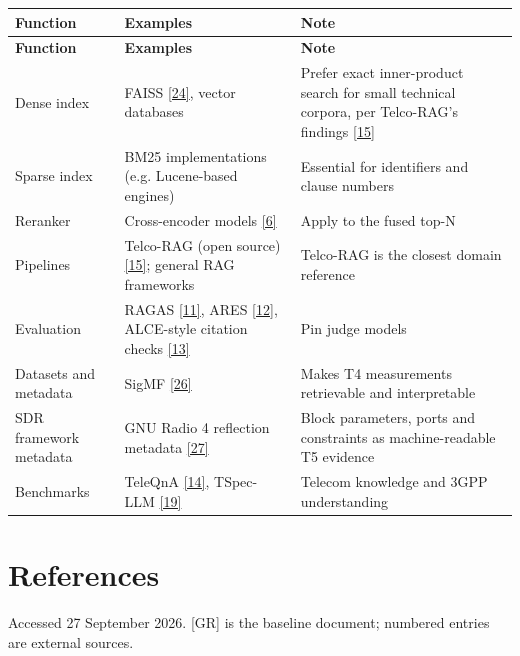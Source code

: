 \documentclass[11pt,a4paper]{article}
\begin{document}
{\small
\begin{longtable}{>{\raggedright\arraybackslash}p{}>{\raggedright\arraybackslash}p{}>{\raggedright\arraybackslash}p{}}
\toprule
\rowcolor{headbg} \textbf{Function} & \textbf{Examples} & \textbf{Note} \\
\midrule
\endfirsthead
\toprule
\rowcolor{headbg} \textbf{Function} & \textbf{Examples} & \textbf{Note} \\
\midrule
\endhead
\bottomrule
\endlastfoot
Dense index & FAISS \hyperlink{ref24}{[24]}, vector databases & Prefer exact inner-product search for small technical corpora, per Telco-RAG's findings \hyperlink{ref15}{[15]} \\ \arrayrulecolor{rulec}\hline\arrayrulecolor{black}
Sparse index & BM25 implementations (e.g. Lucene-based engines) & Essential for identifiers and clause numbers \\ \arrayrulecolor{rulec}\hline\arrayrulecolor{black}
Reranker & Cross-encoder models \hyperlink{ref6}{[6]} & Apply to the fused top-N \\ \arrayrulecolor{rulec}\hline\arrayrulecolor{black}
Pipelines & Telco-RAG (open source) \hyperlink{ref15}{[15]}; general RAG frameworks & Telco-RAG is the closest domain reference \\ \arrayrulecolor{rulec}\hline\arrayrulecolor{black}
Evaluation & RAGAS \hyperlink{ref11}{[11]}, ARES \hyperlink{ref12}{[12]}, ALCE-style citation checks \hyperlink{ref13}{[13]} & Pin judge models \\ \arrayrulecolor{rulec}\hline\arrayrulecolor{black}
Datasets and metadata & SigMF \hyperlink{ref26}{[26]} & Makes T4 measurements retrievable and interpretable \\ \arrayrulecolor{rulec}\hline\arrayrulecolor{black}
SDR framework metadata & GNU Radio 4 reflection metadata \hyperlink{ref27}{[27]} & Block parameters, ports and constraints as machine-readable T5 evidence \\ \arrayrulecolor{rulec}\hline\arrayrulecolor{black}
Benchmarks & TeleQnA \hyperlink{ref14}{[14]}, TSpec-LLM \hyperlink{ref19}{[19]} & Telecom knowledge and 3GPP understanding \\
\end{longtable}
}
\clearpage
\section{References}\label{sec:references}
Accessed 27 September 2026. [GR] is the baseline document; numbered entries are external sources.
\end{document}
